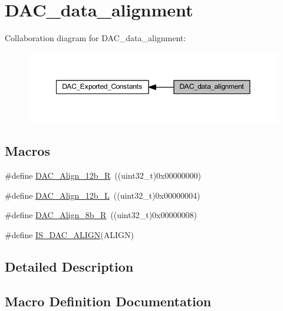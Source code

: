 \hypertarget{group___d_a_c__data__alignment}{}\section{D\+A\+C\+\_\+data\+\_\+alignment}
\label{group___d_a_c__data__alignment}
Collaboration diagram for D\+A\+C\+\_\+data\+\_\+alignment\+:
\nopagebreak
\begin{figure}[H]
\begin{center}
\leavevmode
\includegraphics[width=350pt]{group___d_a_c__data__alignment}
\end{center}
\end{figure}
\subsection*{Macros}
\begin{DoxyCompactItemize}
\item 
\#define \hyperlink{group___d_a_c__data__alignment_ga0f2a6fc71aaf90a27b0caf1bd06e73f2}{D\+A\+C\+\_\+\+Align\+\_\+12b\+\_\+R}~((uint32\+\_\+t)0x00000000)
\item 
\#define \hyperlink{group___d_a_c__data__alignment_gaf3a46d37092eac0d4c9c1039e68208d4}{D\+A\+C\+\_\+\+Align\+\_\+12b\+\_\+L}~((uint32\+\_\+t)0x00000004)
\item 
\#define \hyperlink{group___d_a_c__data__alignment_gaa633fbcf85e97e12c4894eaed530dd8f}{D\+A\+C\+\_\+\+Align\+\_\+8b\+\_\+R}~((uint32\+\_\+t)0x00000008)
\item 
\#define \hyperlink{group___d_a_c__data__alignment_ga7779c36606827a6a2c4423414a441bde}{I\+S\+\_\+\+D\+A\+C\+\_\+\+A\+L\+I\+GN}(A\+L\+I\+GN)
\end{DoxyCompactItemize}


\subsection{Detailed Description}


\subsection{Macro Definition Documentation}
\mbox{\label{group___d_a_c__data__alignment_gaf3a46d37092eac0d4c9c1039e68208d4}} 
